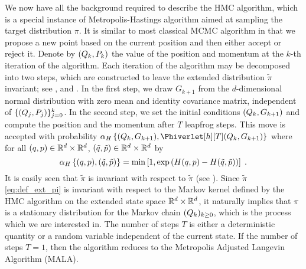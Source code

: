 We now have all the background required to describe the HMC algorithm,
which is a special instance of Metropolis-Hastings algorithm aimed at sampling the  target distribution  $\pi$.
It is similar to most classical MCMC algorithm in that we propose a new point based on the current position and then either accept or reject it.
Denote by $(Q_k,P_k)$ the value of the position and momentum at the $k$-th iteration of the algorithm. Each iteration of the algorithm may be decomposed into two steps, which
are constructed to leave the extended
distribution $\tilde{\pi}$ invariant; see \cite{neal:2011}, \cite{fang:sanz-serna:skeel:2016} and \cite[Theorem 5.2]{bou-rabee:sanz-serna:2018}.
In the first step, we draw $G_{k+1}$ from the $d$-dimensional normal
distribution with zero mean and identity covariance matrix, independent of $\{(Q_j,P_j)\}_{j=0}^k$.
In the second step, we set the initial conditions $(Q_k,G_{k+1})$ and compute the position and the momentum after $T$ leapfrog steps. This move is accepted with probability $\alphaacc\defEns{(\Q_k,G_{k+1}),\Phiverlet[h][T](\Q_k,G_{k+1})}$ where
for all $(q,p) \in \mathbb{R}^d \times \mathbb{R}^d$, $(\tilde{q},\tilde{p}) \in \mathbb{R}^d \times \mathbb{R}^d$ by
\begin{equation}
\label{eq:def_acc_ratio}
  \alpha_{H}\left\lbrace (q,p),(\tilde{q},\tilde{p}) \right\rbrace = \min \left[ 1,   \exp\left(H(q,p)-H(\tilde{q},\tilde{p} \right)) \right] \;.
\end{equation}
It is easily seen that $\tilde{\pi}$ is invariant with respect to $\tilde{\pi}$ (see \cite{fang:sanz-serna:skeel:2016}).  Since $\tilde{\pi}$ \eqref{eq:def_ext_pi} is invariant with respect to the Markov kernel defined by the HMC algorithm on the extended state
space $\mathbb{R}^d \times \mathbb{R}^d$, it naturally implies that $\pi$ is a
stationary distribution for the Markov chain $(Q_k)_{k \geq 0}$,
which is the process which we are interested in. The number of steps $T$ is either a deterministic quantity or a random variable independent of the current state. If the number of
steps $T=1$, then the algorithm reduces to the Metropolis Adjusted
Langevin Algorithm (MALA).



